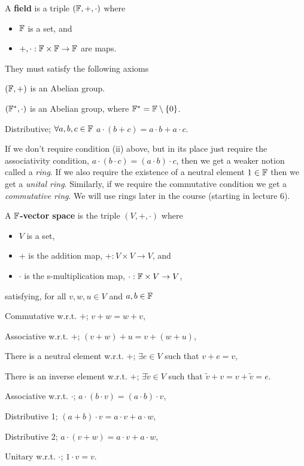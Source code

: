 \bd[Field] 
    A \textbf{field} is a triple $(\mathbb{F},+,\cdot)$ where
    \begin{itemize}
        \item $\mathbb{F}$ is a set, and
        \item $+,\cdot:\mathbb{F}\times \mathbb{F} \to \mathbb{F}$ are maps.
    \end{itemize}
    They must satisfy the following axioms 
    \benr
        \item $(\mathbb{F},+)$ is an Abelian group.
        \item $(\mathbb{F}^*,\cdot)$ is an Abelian group, where $\mathbb{F}^*=\mathbb{F}\setminus\{0\}$. 
        \item Distributive; $\forall a,b,c\in \mathbb{F}$ $a\cdot(b+c) = a\cdot b + a\cdot c$.
    \een
\ed 

\br 
    If we don't require condition (ii) above, but in its place just require the associativity condition,  $a\cdot(b\cdot c) = (a\cdot b)\cdot c$, then we get a weaker notion called a \textit{ring}. If we also require the existence of a neutral element $1\in\mathbb{F}$ then we get a \textit{unital ring}. Similarly, if we require the commutative condition we get a \textit{commutative ring}. We will use rings later in the course (starting in lecture 6). 
\er

    A \textbf{$\mathbb{F}$-vector space} is the triple $(V,+,\cdot)$ where 
    \begin{itemize} 
        \item $V$ is a set, 
        \item $+$ is the addition map, $+:V\times V \to V$, and 
        \item $\cdot$ is the s-multiplication map, $\cdot : \mathbb{F}\times V \to V$,
    \end{itemize} 
    satisfying, for all $v,w,u\in V$ and $a,b\in\mathbb{F}$
    \benr 
        \item Commutative w.r.t. $+$; $v+w=w+v$,
        \item Associative w.r.t. $+$; $(v+w)+ u = v +(w+u)$,
        \item There is a neutral element w.r.t. $+$; $\exists e\in V$ such that $v+e=v$,
        \item There is an inverse element w.r.t. $+$; $\exists \widetilde{v}\in V$ such that $\widetilde{v}+v = v + \widetilde{v} = e$.
        \item Associative w.r.t. $\cdot$; $a\cdot(b\cdot v) = (a\cdot b)\cdot v$, 
        \item Distributive 1; $(a+b)\cdot v = a\cdot v + a\cdot w$,
        \item Distributive 2; $a\cdot(v+w) = a\cdot v + a\cdot w$, 
        \item Unitary w.r.t. $\cdot$; $1\cdot v = v$.
    \een 
\ed 

